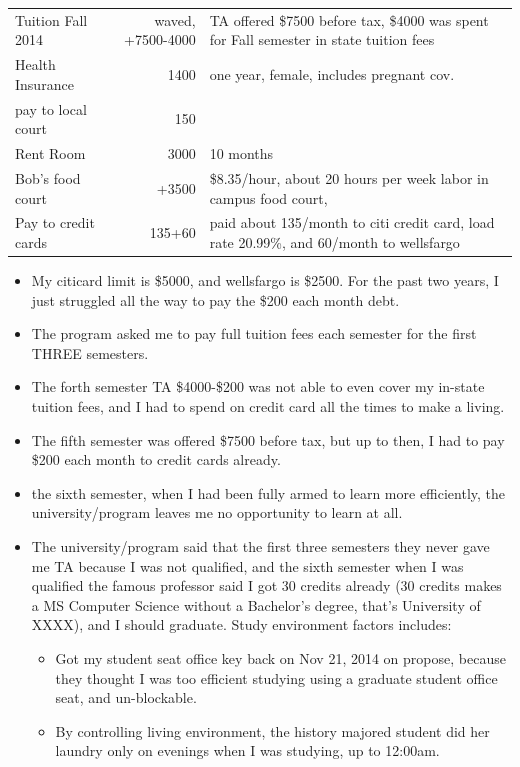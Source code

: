 \documentclass[9pt,b5paper]{article}
\begin{document}
\begin{center}
\begin{tabular}{lrl}
\hline
Tuition Fall 2014 & waved, +7500-4000 & TA offered \$7500 before tax, \$4000 was spent for Fall semester in state tuition fees\\
Health Insurance & 1400 & one year, female, includes pregnant cov.\\
pay to local court & 150 & \\
Rent Room & 3000 & 10 months\\
Bob's food court & +3500 & \$8.35/hour, about 20 hours per week labor in campus food court,\\
Pay to credit cards & 135+60 & paid about 135/month to citi credit card, load rate 20.99\%, and 60/month to wellsfargo\\
\hline
\end{tabular}
\end{center}
\begin{itemize}
\item My citicard limit is \$5000, and wellsfargo is \$2500. For the past two years, I just struggled all the way to pay the \$200 each month debt.
\item The program asked me to pay full tuition fees each semester for the first THREE semesters.
\item The forth semester TA \$4000-\$200 was not able to even cover my in-state tuition fees, and I had to spend on credit card all the times to make a living.
\item The fifth semester was offered \$7500 before tax, but up to then, I had to pay \$200 each month to credit cards already.
\item the sixth semester, when I had been fully armed to learn more efficiently, the university/program leaves me no opportunity to learn at all.
\item The university/program said that the first three semesters they never gave me TA because I was not qualified, and the sixth semester when I was qualified the famous professor said I got 30 credits already (30 credits makes a MS Computer Science without a Bachelor's degree, that's University of XXXX), and I should graduate. Study environment factors includes: 
\begin{itemize}
\item Got my student seat office key back on Nov 21, 2014 on propose, because they thought I was too efficient studying using a graduate student office seat, and un-blockable.
\item By controlling living environment, the history majored student did her laundry only on evenings when I was studying, up to 12:00am.

\end{itemize}
\end{itemize}
\end{document}
